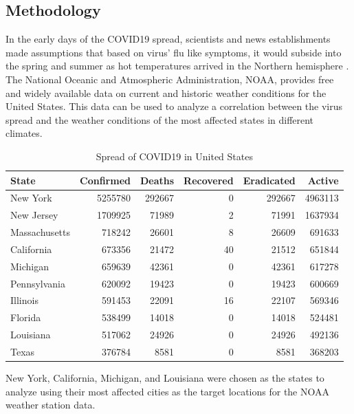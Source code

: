 \documentclass{homework}
\begin{document}
\subsection{Methodology}

In the early days of the COVID19 spread, scientists and news establishments made assumptions that based on virus' flu like symptoms, it would subside into the spring and summer as hot temperatures arrived in the Northern hemisphere \cite{aubrey_2020}. The National Oceanic and Atmospheric Administration, NOAA, provides free and widely available data on current and historic weather conditions for the United States. This data can be used to analyze a correlation between the virus spread and the weather conditions of the most affected states in different climates.

\begin{table}[H]
  \caption{Spread of COVID19 in United States}
  \label{Task 4 States}
  \centering
  \begin{tabular}{lrrrrr}
    \toprule
    State         & Confirmed & Deaths & Recovered & Eradicated & Active  \\
    \midrule
    New York      & 5255780   & 292667 & 0         & 292667     & 4963113 \\
    New Jersey    & 1709925   & 71989  & 2         & 71991      & 1637934 \\
    Massachusetts & 718242    & 26601  & 8         & 26609      & 691633  \\
    California    & 673356    & 21472  & 40        & 21512      & 651844  \\
    Michigan      & 659639    & 42361  & 0         & 42361      & 617278  \\
    Pennsylvania  & 620092    & 19423  & 0         & 19423      & 600669  \\
    Illinois      & 591453    & 22091  & 16        & 22107      & 569346  \\
    Florida       & 538499    & 14018  & 0         & 14018      & 524481  \\
    Louisiana     & 517062    & 24926  & 0         & 24926      & 492136  \\
    Texas         & 376784    & 8581   & 0         & 8581       & 368203  \\
    \bottomrule
  \end{tabular}
\end{table}

New York, California, Michigan, and Louisiana were chosen as the states to analyze using their most affected cities as the target locations for the NOAA weather station data.
\end{document}
